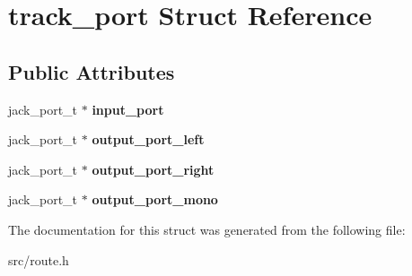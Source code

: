 \hypertarget{structtrack__port}{}\section{track\+\_\+port Struct Reference}
\label{structtrack__port}
\subsection*{Public Attributes}
\begin{DoxyCompactItemize}
\item 
\mbox{\label{structtrack__port_a1d925d57307d6b17c503ced4aa99a8bd}} 
jack\+\_\+port\+\_\+t $\ast$ {\bfseries input\+\_\+port}
\item 
\mbox{\label{structtrack__port_a32201649f5f0fe8cb52a1a05f4292f94}} 
jack\+\_\+port\+\_\+t $\ast$ {\bfseries output\+\_\+port\+\_\+left}
\item 
\mbox{\label{structtrack__port_a5bf5d29bcc3001f5b69350f14d54da6e}} 
jack\+\_\+port\+\_\+t $\ast$ {\bfseries output\+\_\+port\+\_\+right}
\item 
\mbox{\label{structtrack__port_a9e1a7657a8e1b3852c76c1d504ca8e68}} 
jack\+\_\+port\+\_\+t $\ast$ {\bfseries output\+\_\+port\+\_\+mono}
\end{DoxyCompactItemize}


The documentation for this struct was generated from the following file\+:\begin{DoxyCompactItemize}
\item 
src/route.\+h\end{DoxyCompactItemize}
